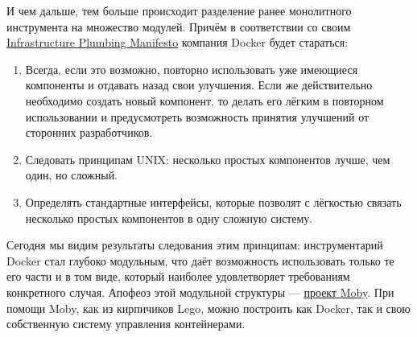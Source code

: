 \documentclass[14pt, a4paper]{article}
\begin{document}
И чем дальше, тем больше происходит разделение ранее монолитного инструмента на множество
модулей. Причём в соответствии со своим \href{https://www.docker.com/blog/runc/}{Infrastructure Plumbing Manifesto} компания Docker будет
стараться:
\begin{enumerate}
    \item Всегда, если это возможно, повторно использовать уже имеющиеся компоненты и отдавать
    назад свои улучшения. Если же действительно необходимо создать новый компонент, то
    делать его лёгким в повторном использовании и предусмотреть возможность принятия
    улучшений от сторонних разработчиков.
    \item Следовать принципам UNIX: несколько простых компонентов лучше, чем один, но сложный.
    \item Определять стандартные интерфейсы, которые позволят с лёгкостью связать несколько
    простых компонентов в одну сложную систему.
\end{enumerate}

Сегодня мы видим результаты следования этим принципам: инструментарий Docker стал глубоко
модульным, что даёт возможность использовать только те его части и в том виде, который наиболее
удовлетворяет требованиям конкретного случая. Апофеоз этой модульной структуры — \href{https://mobyproject.org/}{проект Moby}.
При помощи Moby, как из кирпичиков Lego, можно построить как Docker, так и свою собственную
систему управления контейнерами.

\begin{figure}[H]
    \centering
    \label{3.2}
\end{figure}
\end{document}
